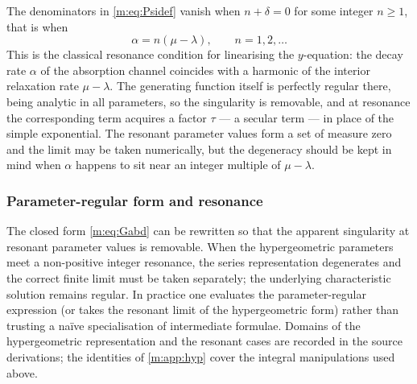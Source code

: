 \begin{remark}[Resonance]
\label{m:rem:resonance}
The denominators in \cref{m:eq:Psidef} vanish when $n+\delta=0$ for some integer
$n\ge1$, that is when
\begin{equation*}
\alpha = n(\mu-\lambda),\qquad n=1,2,\dots
\end{equation*}
This is the classical resonance condition for linearising the $y$-equation: the
decay rate $\alpha$ of the absorption channel coincides with a harmonic of the
interior relaxation rate $\mu-\lambda$. The generating function itself is perfectly
regular there, being analytic in all parameters, so the singularity is removable,
and at resonance the corresponding term acquires a factor $\tau$ --- a secular term
--- in place of the simple exponential. The resonant parameter values form a set of
measure zero and the limit may be taken numerically, but the degeneracy should be
kept in mind when $\alpha$ happens to sit near an integer multiple of $\mu-\lambda$.
\end{remark}


\subsubsection*{Parameter-regular form and resonance}
\label{m:sec:moc-resonance}

The closed form \cref{m:eq:Gabd} can be rewritten so that the apparent singularity
at resonant parameter values is removable. When the hypergeometric parameters meet
a non-positive integer resonance, the series representation degenerates and the
correct finite limit must be taken separately; the underlying characteristic
solution remains regular. In practice one evaluates the parameter-regular
expression (or takes the resonant limit of the hypergeometric form) rather than
trusting a na\"ive specialisation of intermediate formulae. Domains of the
hypergeometric representation and the resonant cases are recorded in the source
derivations; the identities of \cref{m:app:hyp} cover the integral manipulations
used above.

\FloatBarrier
